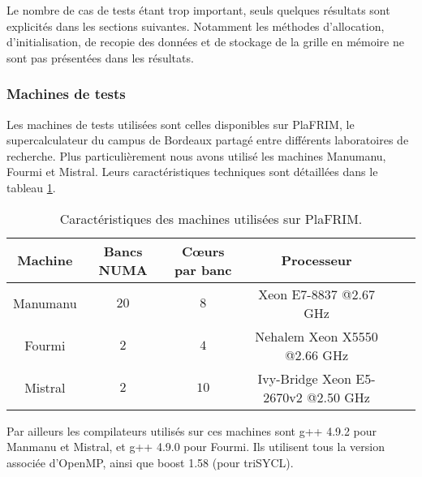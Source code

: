 Le nombre de cas de tests étant trop important, seuls quelques résultats sont explicités dans les sections suivantes. Notamment les méthodes d'allocation, d'initialisation, de recopie des données et de stockage de la grille en mémoire ne sont pas présentées dans les résultats.

\subsubsection*{Machines de tests}

Les machines de tests utilisées sont celles disponibles sur \textsf{PlaFRIM}, le supercalculateur du campus de Bordeaux partagé entre différents laboratoires de recherche. Plus particulièrement nous avons utilisé les machines \textsf{Manumanu}, \textsf{Fourmi} et \textsf{Mistral}. Leurs caractéristiques techniques sont détaillées dans le tableau \ref{tab:carac_mach}.

\begin{table}
{
\caption{Caractéristiques des machines utilisées sur \textsf{PlaFRIM}.}
\label{tab:carac_mach}
}
{
\begin{tabular}{||c||c|c|c|c|c||}
\hline
Machine & Bancs NUMA & Cœurs par banc & Processeur\\%
\hline
\hline
Manumanu & $20$ & $8$ & Xeon E7-8837 @2.67 GHz \\%
Fourmi & $2$ & $4$ & Nehalem Xeon X5550 @2.66 GHz \\%
Mistral & $2$ & $10$ & Ivy-Bridge Xeon E5-2670v2 @2.50 GHz \\%
\hline
\end{tabular}
}
\end{table} 

Par ailleurs les compilateurs utilisés sur ces machines sont \textsf{g++ 4.9.2} pour \textsf{Manmanu} et \textsf{Mistral}, et \textsf{g++ 4.9.0} pour \textsf{Fourmi}. Ils utilisent tous la version associée d'\textsf{OpenMP}, ainsi que \textsf{boost 1.58} (pour \textsf{triSYCL}).

